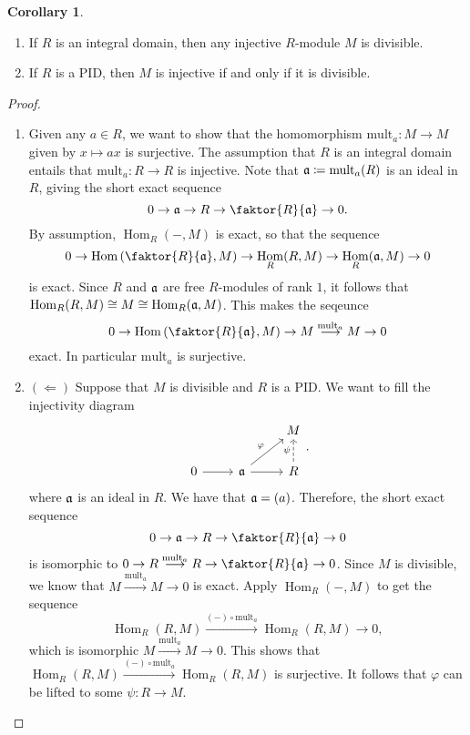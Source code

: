 \documentclass[10pt,letterpaper,cm]{nupset}
\theoremstyle{definition}
\theoremstyle{theorem}
\newtheorem{corollary}[definition]{Corollary}
\theoremstyle{remark}
\newcommand{\1}{\mathbf{1}}
\newcommand{\0}{\vec 0}
\DeclareMathOperator{\Hom}{Hom}
\begin{document}
\begin{corollary} $ $
\begin{enumerate}
\item If $R$ is an integral domain, then any injective $R$-module $M$ is divisible.
\item If $R$ is a PID, then $M$ is injective if and only if it is divisible.
\end{enumerate}
\end{corollary}
\begin{proof} $ $
\begin{enumerate}
\item Given any $a\in R$, we want to show that the homomorphism $\text{mult}_a : M \to M$ given by $x\mapsto ax$ is surjective. The assumption that $R$ is an integral domain entails that $\text{mult}_a : R\to R$ is injective. Note that $\frak{a}\coloneqq  \text{mult}_a(R)$ is an ideal in $R$, giving the short exact sequence $$0 \to \frak{a} \to R \to \faktor{R}{\frak{a}}\to 0.  $$ By assumption, $\Hom_R(-, M)$ is exact, so that the sequence $$0 \to \Hom\left(\faktor{R}{\frak{a}}, M \right) \to \Hom_R(R, M) \to \Hom_R(\frak{a}, M) \to 0   $$ is exact. Since $R$ and $\frak{a}$ are free $R$-modules of rank $1$, it follows that $\Hom_R(R, M) \cong M \cong  \Hom_R(\frak{a}, M)$. This makes the seqeunce  $$0 \to \Hom\left(\faktor{R}{\frak{a}}, M \right) \to M \overset{\text{mult}_a}{\longrightarrow} M \to 0 $$ exact. In particular $\text{mult}_a$ is surjective.

\item $(\Longleftarrow)$ Suppose that $M$ is divisible and $R$ is a PID. We want to fill the injectivity diagram
\[
\begin{tikzcd}
 &  & M \\
0 \arrow[r] & \frak{a} \arrow[r] \arrow[ru, "\varphi"] & R \arrow[u, "\psi", dashed]
\end{tikzcd}.
\]
where $\frak{a}$ is an ideal in $R$. We have that $\frak{a} = (a)$. Therefore, the short exact sequence $$0 \to \frak{a} \to R \to \faktor{R}{\frak{a}} \to 0$$ is isomorphic to $0 \to R \overset{\text{mult}_a}{\longrightarrow} R \to \faktor{R}{\frak{a}}\to 0$. Since $M$ is divisible, we know that $M \overset{\text{mult}_a}{\longrightarrow} M \to 0$ is exact.  Apply $\Hom_R(-, M)$ to get the sequence $$\Hom_R(R, M) \overset{(-)\circ \text{mult}_a}{\longrightarrow} \Hom_R(R, M) \to 0,$$ which is isomorphic $M \overset{\text{mult}_a}{\longrightarrow} M \to 0$. This shows that $\Hom_R(R, M) \overset{(-)\circ \text{mult}_a}{\longrightarrow} \Hom_R(R, M)$ is surjective. It follows that $\varphi$ can be lifted to some $\psi : R \to M$.
\end{enumerate}
\end{proof}
\end{document}
